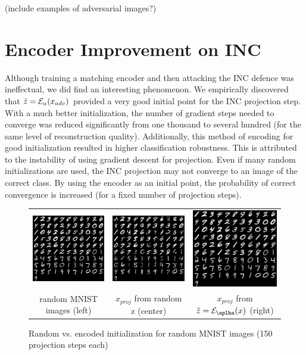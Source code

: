 \documentclass[twoside]{article}
\theoremstyle{definition}
\begin{document}
(include examples of adversarial images?)

\section{Encoder Improvement on INC}
Although training a matching encoder and then attacking the INC defence was ineffectual, we did find an interesting phenomenon. We empirically discovered that $\Hat{z} =\mathcal{E}_{\alpha}(x_{adv})$ provided a very good initial point for the INC projection step. With a much better initialization, the number of gradient steps needed to converge was reduced significantly from one thousand to several hundred (for the same level of reconstruction quality). Additionally, this method of encoding for good initialization resulted in higher classification robustness. This is attributed to the instability of using gradient descent for projection. Even if many random initializations are used, the INC projection may not converge to an image of the correct class. By using the encoder as an initial point, the probability of correct convergence is increased (for a fixed number of projection steps). 

\begin{figure}[H]
\centering
\caption{Random vs. encoded initialization for random MNIST images (150 projection steps each)}
\begin{tabular}{ccc}
\includegraphics[width=2in]{reconstr_original.png} &
\includegraphics[width=2in]{reconstr_random_z.png} &
\includegraphics[width=2in]{reconstr_encoded.png} \\
random MNIST images (left) &
$x_{proj}$ from random z (center) & 
$x_{proj}$ from $\hat{z} = \mathcal{E}_{\aplha}(x)$ (right)
\end{tabular}
\end{figure}
\end{document}
